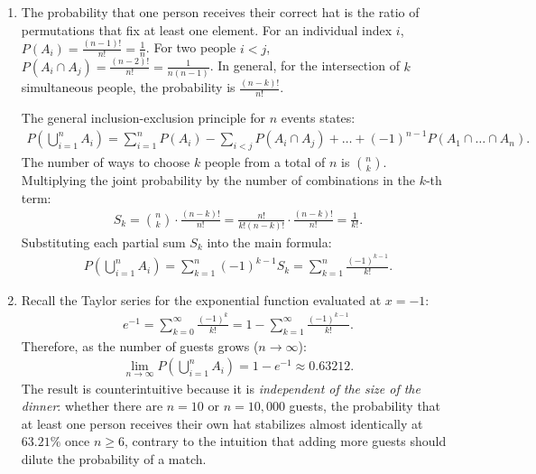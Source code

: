 \begin{solproblema}[prob:a4ff50c]
	\begin{enumerate}
		\item The probability that one person receives their correct hat is the ratio of permutations that fix at least one element. For an individual index $i$, $P(A_i) = \frac{(n-1)!}{n!} = \frac{1}{n}$. For two people $i < j$, $P(A_i \cap A_j) = \frac{(n-2)!}{n!} = \frac{1}{n(n-1)}$. In general, for the intersection of $k$ simultaneous people, the probability is $\frac{(n-k)!}{n!}$.

		The general inclusion-exclusion principle for $n$ events states:
		\begin{align}
			P\left( \bigcup_{i=1}^{n} A_i \right) = \sum_{i=1}^n P(A_i) - \sum_{i<j} P(A_i \cap A_j) + \dots + (-1)^{n-1} P(A_1 \cap \dots \cap A_n).
		\end{align}
		The number of ways to choose $k$ people from a total of $n$ is $\binom{n}{k}$. Multiplying the joint probability by the number of combinations in the $k$-th term:
		\begin{align}
			S_k = \binom{n}{k} \cdot \frac{(n-k)!}{n!} = \frac{n!}{k!(n-k)!} \cdot \frac{(n-k)!}{n!} = \frac{1}{k!}.
		\end{align}
		Substituting each partial sum $S_k$ into the main formula:
		\begin{align}
			P\left( \bigcup_{i=1}^{n} A_i \right) = \sum_{k=1}^{n} (-1)^{k-1} S_k = \sum_{k=1}^{n} \frac{(-1)^{k-1}}{k!}.
		\end{align}

		\item Recall the Taylor series for the exponential function evaluated at $x = -1$:
		\begin{align}
			e^{-1} = \sum_{k=0}^{\infty} \frac{(-1)^k}{k!} = 1 - \sum_{k=1}^{\infty} \frac{(-1)^{k-1}}{k!}.
		\end{align}
		Therefore, as the number of guests grows ($n \to \infty$):
		\begin{align}
			\lim_{n \to \infty} P\left( \bigcup_{i=1}^{n} A_i \right) = 1 - e^{-1} \approx 0.63212.
		\end{align}
		The result is counterintuitive because it is \emph{independent of the size of the dinner}: whether there are $n=10$ or $n=10{,}000$ guests, the probability that at least one person receives their own hat stabilizes almost identically at $63.21\%$ once $n \ge 6$, contrary to the intuition that adding more guests should dilute the probability of a match.
	\end{enumerate}
\end{solproblema}


